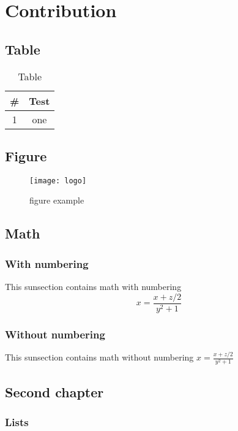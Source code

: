 \chapter{Contribution}
\section{Table}

\begin{table}[!th]
\begin{center}
\begin{tabular}{|c|c|}
\hline
\# & Test \\ \hline \hline
1 & one \\ \hline
\end{tabular}
\caption{Table}
\label{ex:table}
\end{center}
\end{table}

\section{Figure}
\begin{figure}[h]
\texttt{[image: logo]}
\caption{figure example}
\label{ex:figure}
\end{figure}


\section{Math}
\subsection{With numbering}
This sunsection contains math with numbering
\begin{equation}
x=\frac{x+z/2}{y^2+1}
\label{ex:equation}
\end{equation}

\subsection{Without numbering}
This sunsection contains math without numbering $x=\frac{x+z/2}{y^2+1}$

\section{Second chapter}
\subsection{Lists}
